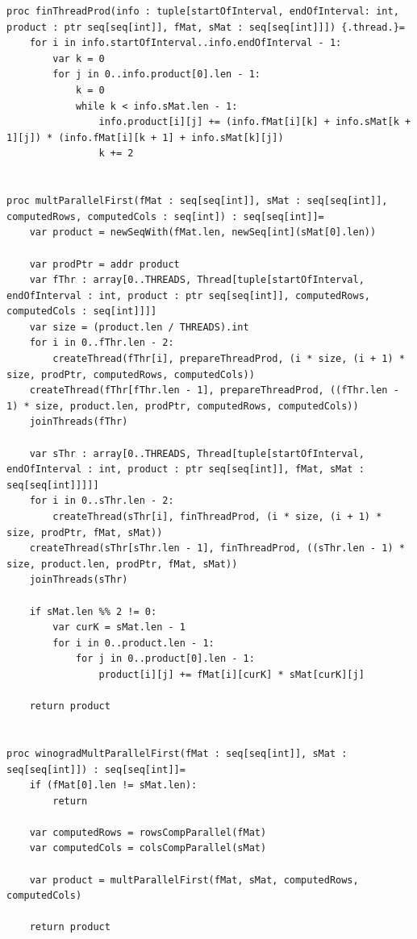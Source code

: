 \documentclass[12pt]{report}
\begin{document}
\begin{lstlisting}[caption=Реализация первой схемы параллельного алгоритма Копперсмита-Винограда,
label={list:paral}]
proc finThreadProd(info : tuple[startOfInterval, endOfInterval: int, product : ptr seq[seq[int]], fMat, sMat : seq[seq[int]]]) {.thread.}=
    for i in info.startOfInterval..info.endOfInterval - 1:
        var k = 0
        for j in 0..info.product[0].len - 1:
            k = 0
            while k < info.sMat.len - 1:
                info.product[i][j] += (info.fMat[i][k] + info.sMat[k + 1][j]) * (info.fMat[i][k + 1] + info.sMat[k][j])
                k += 2


proc multParallelFirst(fMat : seq[seq[int]], sMat : seq[seq[int]], computedRows, computedCols : seq[int]) : seq[seq[int]]=
    var product = newSeqWith(fMat.len, newSeq[int](sMat[0].len))

    var prodPtr = addr product
    var fThr : array[0..THREADS, Thread[tuple[startOfInterval, endOfInterval : int, product : ptr seq[seq[int]], computedRows, computedCols : seq[int]]]]
    var size = (product.len / THREADS).int
    for i in 0..fThr.len - 2:
        createThread(fThr[i], prepareThreadProd, (i * size, (i + 1) * size, prodPtr, computedRows, computedCols))
    createThread(fThr[fThr.len - 1], prepareThreadProd, ((fThr.len - 1) * size, product.len, prodPtr, computedRows, computedCols))
    joinThreads(fThr)

    var sThr : array[0..THREADS, Thread[tuple[startOfInterval, endOfInterval : int, product : ptr seq[seq[int]], fMat, sMat : seq[seq[int]]]]]
    for i in 0..sThr.len - 2:
        createThread(sThr[i], finThreadProd, (i * size, (i + 1) * size, prodPtr, fMat, sMat))
    createThread(sThr[sThr.len - 1], finThreadProd, ((sThr.len - 1) * size, product.len, prodPtr, fMat, sMat))
    joinThreads(sThr)

    if sMat.len %% 2 != 0:
        var curK = sMat.len - 1
        for i in 0..product.len - 1:
            for j in 0..product[0].len - 1:
                product[i][j] += fMat[i][curK] * sMat[curK][j]

    return product


proc winogradMultParallelFirst(fMat : seq[seq[int]], sMat : seq[seq[int]]) : seq[seq[int]]=
    if (fMat[0].len != sMat.len):
        return

    var computedRows = rowsCompParallel(fMat)
    var computedCols = colsCompParallel(sMat)

    var product = multParallelFirst(fMat, sMat, computedRows, computedCols)

    return product
\end{lstlisting}
\end{document}

